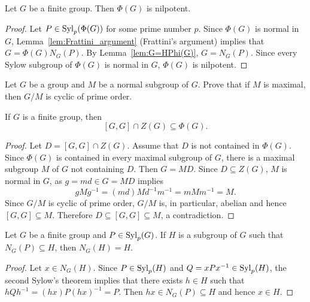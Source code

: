 \begin{theorem}[Frattini]
\label{thm:Frattini}
Let $G$ be a finite group. Then $\Phi(G)$ is nilpotent.
\end{theorem}

\begin{proof}
Let $P\in\mathrm{Syl}_p(\Phi(G))$ for some prime number $p$. Since $\Phi(G)$ is normal in 
$G$, Lemma~\ref{lem:Frattini_argument} (Frattini's argument) implies that 
$G=\Phi(G)N_G(P)$. By Lemma~\ref{lem:G=HPhi(G)},
$G=N_G(P)$. Since every Sylow subgroup of $\Phi(G)$ is normal in $G$,
$\Phi(G)$ is nilpotent. 
\end{proof}

\begin{exercise}
\label{xca:G/M}
Let $G$ be a group and $M$ be a normal subgroup of $G$. Prove that if  
$M$ is maximal, then 
$G/M$ is cyclic of prime order. 
\end{exercise}


\begin{theorem}
	\label{thm:Gaschutz}
	If $G$ is a finite group, then 
	\[
	[G,G]\cap Z(G)\subseteq\Phi(G).
	\]
\end{theorem}

\begin{proof}
Let $D=[G,G]\cap Z(G)$. Assume that $D$ is not contained in $\Phi(G)$.
Since $\Phi(G)$ is contained in every maximal subgroup of $G$, 
there is a maximal subgroup $M$ of $G$ not containing $D$. Then
$G=MD$. Since $D\subseteq Z(G)$, $M$ is normal in $G$, as 
	$g=md\in G=MD$ implies 
	\[
		gMg^{-1}=(md)Md^{-1}m^{-1}=mMm^{-1}=M.
	\]
	Since $G/M$ is cyclic of prime order, 
	$G/M$ is, in particular, abelian and hence $[G,G]\subseteq M$. Therefore 
	$D\subseteq [G,G]\subseteq M$, a contradiction.
\end{proof}

\begin{lemma}
\label{lem:N_G(H)=H}
Let $G$ be a finite group and $P\in\mathrm{Syl}_p(G)$. If $H$ is a subgroup of $G$ such that
$N_G(P)\subseteq H$, then $N_G(H)=H$.
\end{lemma}

\begin{proof}
Let $x\in N_G(H)$. Since $P\in\mathrm{Syl}_p(H)$ and $Q=xPx^{-1}\in\mathrm{Syl}_p(H)$, the second Sylow's theorem 
implies that there exists 
$h\in H$ such that $hQh^{-1}=(hx)P(hx)^{-1}=P$. Then $hx\in
N_G(P)\subseteq H$ and hence $x\in H$. 
\end{proof}

